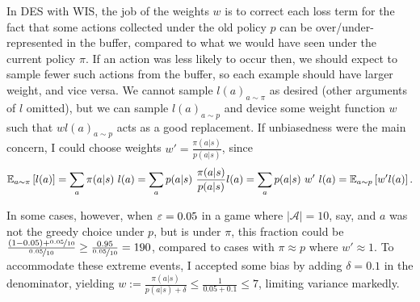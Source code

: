 \documentclass{article}
\begin{document}
In DES with WIS, the job of the weights \(w\) is to correct each loss term for the fact that some actions collected under the old policy \(p\) can be over/under-represented in the buffer, compared to what we would have seen under the current policy \(\pi\). If an action was less likely to occur then, we should expect to sample fewer such actions from the buffer, so each example should have larger weight, and vice versa. We cannot sample \(l(a)_{a \sim \pi}\) as desired (other arguments of \(l\) omitted), but we can sample \(l(a)_{a \sim p}\) and device some weight function \(w\) such that \(w l(a)_{a \sim p}\) acts as a good replacement. If unbiasedness were the main concern, I could choose weights \(w' = \frac{\pi(a|s)}{p(a|s)}\), since
\[
    \mathbb{E}_{a \sim \pi}\left[ l(a) \right]
    = \sum_{a} {\pi(a|s) \ l(a)}
    = \sum_{a} {p(a|s) \ \frac{\pi(a|s)}{p(a|s)} l(a)}
    = \sum_{a} {p(a|s) \ w' \ l(a)}
    = \mathbb{E}_{a \sim p} \left[ w' l(a) \right].
\]

In some cases, however, when \(\varepsilon=0.05\) in a game where \(|\mathcal{A}| = 10\), say, and \(a\) was not the greedy choice under \(p\), but is under \(\pi\), this fraction could be \(\frac{(1-0.05) + \nicefrac{0.05}{10}}{\nicefrac{0.05}{10}} \ge \frac{0.95}{\nicefrac{0.05}{10}} = 190\), compared to cases with \(\pi \approx p\) where \(w' \approx 1\). To accommodate these extreme events, I accepted some bias by adding \(\delta = 0.1\) in the denominator, yielding \(w := \frac{\pi(a|s)}{p(a|s) + \delta} \le \frac{1}{0.05 + 0.1} \le 7\), limiting variance markedly.
\end{document}
